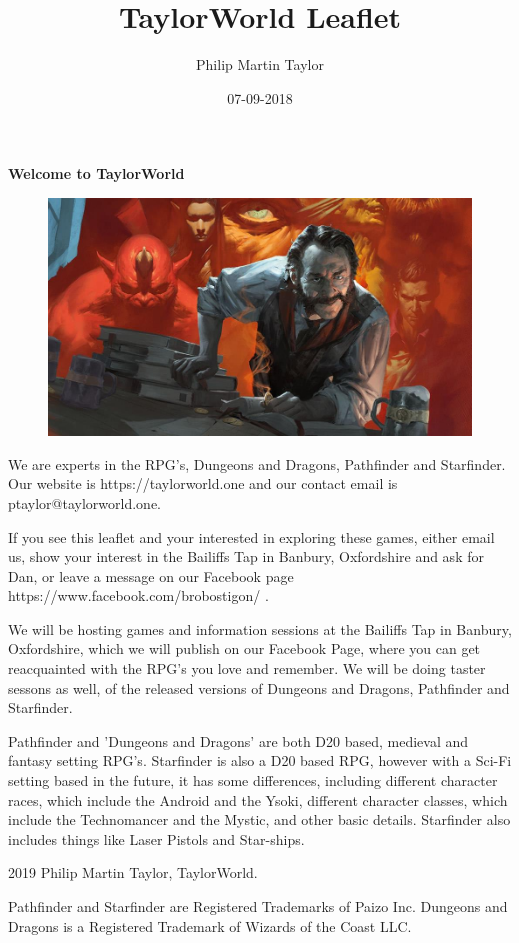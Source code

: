 \documentclass[14pt]{extreport}
\date{07-09-2018}
\author{Philip Martin Taylor}
\title{TaylorWorld Leaflet}
\begin{document}
 
\begin{center} 
\textbf{Welcome to TaylorWorld\texttrademark} 
\end{center} 
\begin{figure}[h]
  \centering
  \includegraphics[scale=0.15]{alchemist.jpg}
\end{figure}
\begin{flushleft} We are experts in the RPG's, Dungeons and Dragons, Pathfinder and Starfinder. Our website is https://taylorworld.one and our contact email is ptaylor@taylorworld.one. 
\end{flushleft} 
\begin{flushleft}
  If you see this leaflet and your interested in exploring these games, either email us, show your interest in the Bailiffs Tap in Banbury, Oxfordshire and ask for Dan, or leave a message on our Facebook page https://www.facebook.com/brobostigon/ . 
\end{flushleft} 
\begin{flushleft}
 We will be hosting games and information sessions at the Bailiffs Tap in Banbury, Oxfordshire, which we will publish on our Facebook Page, where you can get reacquainted with the RPG's you love and remember. We will be doing taster sessons as well, of the released versions of Dungeons and Dragons, Pathfinder and Starfinder. 
\end{flushleft} 
\begin{flushleft}
  Pathfinder and 'Dungeons and Dragons' are both D20 based, medieval and fantasy setting RPG's. Starfinder is also a D20 based RPG, however with a Sci-Fi setting based in the future, it has some differences, including different character races, which include the Android and the Ysoki, different character classes, which include the Technomancer and the Mystic, and other basic details. Starfinder also includes things like Laser Pistols and 
Star-ships. 
\end{flushleft} 
\begin{center}
  \textcopyright{} 2019 Philip Martin Taylor, TaylorWorld.
\end{center} 
\begin{center}
  Pathfinder and Starfinder are Registered Trademarks of Paizo Inc. Dungeons and Dragons is a Registered Trademark of Wizards of 
the Coast LLC. 
\end{center}
\end{document}
